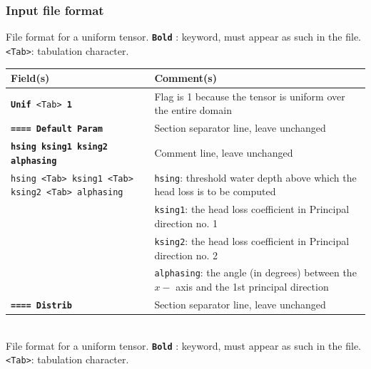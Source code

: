\subsubsection*{Input file format}
%
File format for a uniform tensor.  \texttt{\textbf{Bold}} : keyword, must appear as such in the file. \texttt{<Tab>}: tabulation character. \\
    \begin{tabular}{p{6cm} | p{9cm}}
    \hline
    Field(s) & Comment(s) \\
    \hline  \hline
    \texttt{\textbf{Unif} <Tab> \textbf{1}} & Flag is 1 because the tensor is uniform over the entire domain \\ \hline
    \texttt{\textbf{==== Default Param}} & Section separator line, leave unchanged \\  \hline
    \texttt{\textbf{hsing ksing1 ksing2 alphasing}} & Comment line, leave unchanged \\  \hline
    \texttt{hsing <Tab> ksing1 <Tab> ksing2 <Tab> alphasing} & \texttt{hsing}: threshold water depth above which the head loss is to be computed \\
     & \texttt{ksing1}: the head loss coefficient in Principal direction no. 1 \\
     & \texttt{ksing2}: the head loss coefficient in Principal direction no. 2 \\
     & \texttt{alphasing}: the angle (in degrees) between the $x-$ axis and the 1st principal direction \\
     \hline
    \texttt{\textbf{==== Distrib}} & Section separator line, leave unchanged \\  \hline
    \end{tabular}
%
\vspace{10mm} \\
%
File format for a uniform tensor.  \texttt{\textbf{Bold}} : keyword, must appear as such in the file. \texttt{<Tab>}: tabulation character. \\
